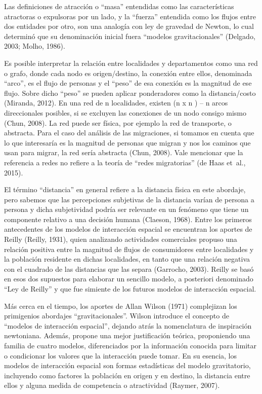 \documentclass[12pt,spanish,]{article}
\begin{document}
Las definiciones de atracción o ``masa'' entendidas como las
características atractoras o expulsoras por un lado, y la ``fuerza''
entendida como los flujos entre dos entidades por otro, son una analogía
con ley de gravedad de Newton, lo cual determinó que su denominación
inicial fuera ``modelos gravitacionales'' (Delgado, 2003; Molho, 1986).

Es posible interpretar la relación entre localidades y departamentos
como una red o grafo, donde cada nodo es origen/destino, la conexión
entre ellos, denominada ``arco'', es el flujo de personas y el ``peso''
de esa conexión es la magnitud de ese flujo. Sobre dicho ``peso'' se
pueden aplicar ponderadores como la distancia/costo (Miranda, 2012). En
una red de n localidades, existen (n x n ) -- n arcos direccionales
posibles, si se excluyen las conexiones de un nodo consigo mismo (Chun,
2008). La red puede ser física, por ejemplo la red de transporte, o
abstracta. Para el caso del análisis de las migraciones, si tomamos en
cuenta que lo que interesaría es la magnitud de personas que migran y
nos los caminos que usan para migrar, la red sería abstracta (Chun,
2008). Vale mencionar que la referencia a redes no refiere a la teoría
de ``redes migratorias'' (de Haas et~al., 2015).

El término ``distancia'' en general refiere a la distancia física en
este abordaje, pero sabemos que las percepciones subjetivas de la
distancia varían de persona a persona y dicha subjetividad podría ser
relevante en un fenómeno que tiene un componente relativo a una decisión
humana (Claeson, 1968). Entre los primeros antecedentes de los modelos
de interacción espacial se encuentran los aportes de Reilly (Reilly,
1931), quien analizando actividades comerciales propuso una relación
positiva entre la magnitud de flujos de consumidores entre localidades y
la población residente en dichas localidades, en tanto que una relación
negativa con el cuadrado de las distancias que las separa (Garrocho,
2003). Reilly se basó en esos dos supuestos para elaborar un sencillo
modelo, a posteriori denominado ``Ley de Reilly'' y que fue simiente de
los futuros modelos de interacción espacial.

Más cerca en el tiempo, los aportes de Allan Wilson (1971) complejizan
los primigenios abordajes ``gravitacionales''. Wilson introduce el
concepto de ``modelos de interacción espacial'', dejando atrás la
nomenclatura de inspiración newtoniana. Además, propone una mejor
justificación teórica, proponiendo una familia de cuatro modelos,
diferenciados por la información conocida para limitar o condicionar los
valores que la interacción puede tomar. En su esencia, los modelos de
interacción espacial son formas estadísticas del modelo gravitatorio,
incluyendo como factores la población en origen y en destino, la
distancia entre ellos y alguna medida de competencia o atractividad
(Raymer, 2007).
\end{document}
